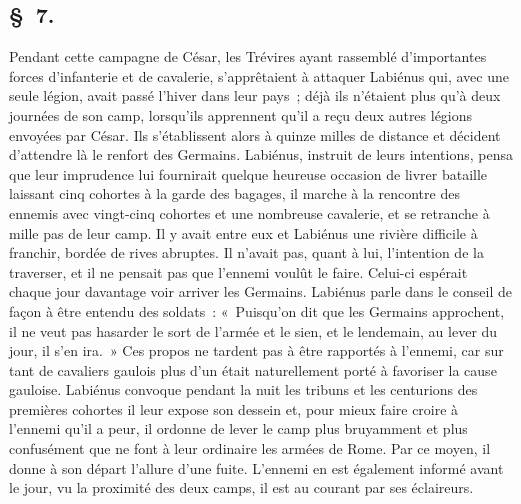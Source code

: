 \documentclass[french,twoside]{book} %
\begin{document}
\subsection[{§ 7.}]{ \textsc{§ 7.} }
\noindent Pendant cette campagne de César, les Trévires ayant rassemblé d’importantes forces d’infanterie et de cavalerie, s’apprêtaient à attaquer Labiénus qui, avec une seule légion, avait passé l’hiver dans leur pays ; déjà ils n’étaient plus qu’à deux journées de son camp, lorsqu’ils apprennent qu’il a reçu deux autres légions envoyées par César. Ils s’établissent alors à quinze milles de distance et décident d’attendre là le renfort des Germains. Labiénus, instruit de leurs intentions, pensa que leur imprudence lui fournirait quelque heureuse occasion de livrer bataille laissant cinq cohortes à la garde des bagages, il marche à la rencontre des ennemis avec vingt-cinq cohortes et une nombreuse cavalerie, et se retranche à mille pas de leur camp. Il y avait entre eux et Labiénus une rivière difficile à franchir, bordée de rives abruptes. Il n’avait pas, quant à lui, l’intention de la traverser, et il ne pensait pas que l’ennemi voulût le faire. Celui-ci espérait chaque jour davantage voir arriver les Germains. Labiénus parle dans le conseil de façon à être entendu des soldats : « Puisqu’on dit que les Germains approchent, il ne veut pas hasarder le sort de l’armée et le sien, et le lendemain, au lever du jour, il s’en ira. » Ces propos ne tardent pas à être rapportés à l’ennemi, car sur tant de cavaliers gaulois plus d’un était naturellement porté à favoriser la cause gauloise. Labiénus convoque pendant la nuit les tribuns et les centurions des premières cohortes il leur expose son dessein et, pour mieux faire croire à l’ennemi qu’il a peur, il ordonne de lever le camp plus bruyamment et plus confusément que ne font à leur ordinaire les armées de Rome. Par ce moyen, il donne à son départ l’allure d’une fuite. L'ennemi en est également informé avant le jour, vu la proximité des deux camps, il est au courant par ses éclaireurs.
\end{document}
